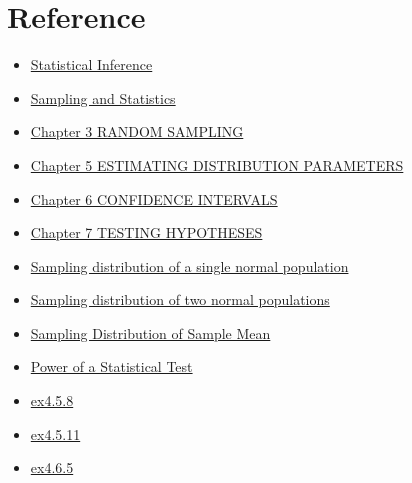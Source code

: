 \section{Reference}
\begin{itemize}
    \item \href{https://byjus.com/maths/statistical-inference/}{Statistical Inference}
    \item \href{https://faculty.etsu.edu/gardnerr/4047/notes-Hogg-McKean-Craig/Hogg-McKean-Craig-4-1.pdf}{Sampling and Statistics}
    \item \href{https://spartan.ac.brocku.ca/~jvrbik/MATH2P82/Statistics.PDF}{Chapter 3 RANDOM SAMPLING}
    \item \href{https://spartan.ac.brocku.ca/~jvrbik/MATH2P82/Statistics.PDF}{Chapter 5 ESTIMATING DISTRIBUTION PARAMETERS}
    \item \href{https://spartan.ac.brocku.ca/~jvrbik/MATH2P82/Statistics.PDF}{Chapter 6 CONFIDENCE INTERVALS}
    \item \href{https://spartan.ac.brocku.ca/~jvrbik/MATH2P82/Statistics.PDF}{Chapter 7 TESTING HYPOTHESES}
    \item \href{https://cloud.moezx.cc/Document/mooc/%E6%B5%99%E5%A4%A7%E6%A6%82%E7%8E%87%E8%AE%BA/%E7%AC%AC42%E8%AE%B2%20.pdf}{Sampling distribution of a single normal population}
    \item \href{https://cloud.moezx.cc/Document/mooc/%E6%B5%99%E5%A4%A7%E6%A6%82%E7%8E%87%E8%AE%BA/%E7%AC%AC43%E8%AE%B2%20.pdf}{Sampling distribution of two normal populations}
    \item \href{https://online.stat.psu.edu/stat414/lesson/26/26.2}{Sampling Distribution of Sample Mean}
    \item \href{https://online.stat.psu.edu/stat415/lesson/25}{Power of a Statistical Test}
    \item \href{https://tomoki-okuno.com/files/math/Ch4_sol.pdf}{ex4.5.8}
    \item \href{https://tomoki-okuno.com/files/math/Ch4_sol.pdf}{ex4.5.11}
    \item \href{https://zhuanlan.zhihu.com/p/570096188}{ex4.6.5}
\end{itemize}